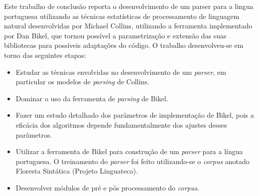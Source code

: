 Este trabalho de conclusão reporta o desenvolvimento de um parser para a lingua portuguesa utilizando as técnicas estatísticas de processamento de linguagem natural desenvolvidas por Michael Collins, utilizando a ferramenta implementado por Dan Bikel, que tornou possível a parametrização e extensão das suas bibliotecas para possíveis adaptações do código. O trabalho desenvolveu-se em torno das seguintes etapas:

\begin{itemize}
	\item Estudar as técnicas envolvidas no desenvolvimento de um \emph{parser}, em particular os modelos de \emph{parsing} de Collins.
	\item Dominar o uso da ferramenta de \emph{parsing} de Bikel.
	\item Fazer um estudo detalhado dos parâmetros de implementação de Bikel, pois a eficácia dos algoritmos depende fundamentalmente dos ajustes desses parâmetros.
	\item Utilizar a ferramenta de Bikel para construção de um \emph{parser} para a língua portuguesa. O treinamento do \emph{parser} foi feito utilizando-se o \emph{corpus} anotado Floresta Sintática (Projeto Linguateca).
	\item Desenvolver módulos de pré e pós processamento do \emph{corpus}.
\end{itemize}


